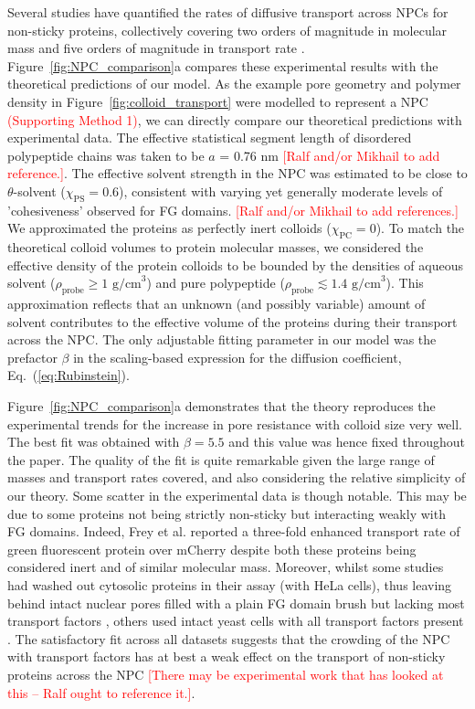 \documentclass[12pt, a4paper]{article}
\newcommand\todo[1]{\textcolor{red}{#1}}
\begin{document}
Several studies have quantified the rates of diffusive transport across NPCs for non-sticky proteins, collectively covering two orders of magnitude in molecular mass and five orders of magnitude in transport rate \cite{Ribbeck2001, Mohr2009, Popken2015, Timney2016, Frey2018}.
Figure~\ref{fig:NPC_comparison}a compares these experimental results with the theoretical predictions of our model.
As the example pore geometry and polymer density in Figure~\ref{fig:colloid_transport} were modelled to represent a NPC \todo{(Supporting Method 1)}, we can directly compare our theoretical predictions with experimental data.
The effective statistical segment length of disordered polypeptide chains was taken to be $a$ = 0.76 nm \todo{[Ralf and/or Mikhail to add reference.]}.
The effective solvent strength in the NPC was estimated to be close to $\theta$-solvent ($\chi_{\text{PS}} = 0.6$), consistent with varying yet generally moderate levels of 'cohesiveness' observed for FG domains. \todo{[Ralf and/or Mikhail to add references.]}
We approximated the proteins as perfectly inert colloids ($\chi_{\text{PC}} = 0$).
To match the theoretical colloid volumes to protein molecular masses, we considered the effective density of the protein colloids to be bounded by the densities of aqueous solvent ($\rho_{\text{probe}} \geq \text{1 g/cm}^3$) and pure polypeptide ($\rho_{\text{probe}} \lesssim \text{1.4 g/cm}^3$).
This approximation reflects that an unknown (and possibly variable) amount of solvent contributes to the effective volume of the proteins during their transport across the NPC.
The only adjustable fitting parameter in our model was the prefactor $\beta$ in the scaling-based expression for the diffusion coefficient, Eq.~(\ref{eq:Rubinstein}).

Figure~\ref{fig:NPC_comparison}a demonstrates that the theory reproduces the experimental trends for the increase in pore resistance with colloid size very well.
The best fit was obtained with $\beta = 5.5$ and this value was hence fixed  throughout the paper.
The quality of the fit is quite remarkable given the large range of masses and transport rates covered, and also considering the relative simplicity of our theory.
Some scatter in the experimental data is though notable.
This may be due to some proteins not being strictly non-sticky but interacting weakly with FG domains.
Indeed, Frey et al. \cite{Frey2018} reported a three-fold enhanced transport rate of green fluorescent protein over mCherry despite both these proteins being considered inert and of similar molecular mass.
Moreover, whilst some studies had washed out cytosolic proteins in their assay (with HeLa cells), thus leaving behind intact nuclear pores filled with a plain FG domain brush but lacking most transport factors \cite{Ribbeck2001, Mohr2009, Frey2018}, others used intact yeast cells with all transport factors present \cite{Popken2015, Timney2016}.
The satisfactory fit across all datasets suggests that the crowding of the NPC with transport factors has at best a weak effect on the transport of non-sticky proteins across the NPC \todo{[There may be experimental work that has looked at this -- Ralf ought to reference it.]}.  
\end{document}
